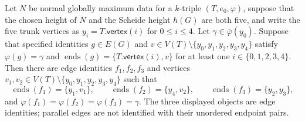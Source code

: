 \begin{lemma}
Let $N$ be normal globally maximum data for a $k$-triple
$(T,e_0,\varphi)$, suppose that the chosen height of $N$ and the Scheide
height $h(G)$ are both five, and write the five trunk vertices as
$y_i=T.\mathsf{vertex}(i)$ for $0\leq i\leq4$.  Let
$\gamma\in\overline\varphi(y_0)$.  Suppose that specified identities
$g\in E(G)$ and $v\in V(T)\setminus\{y_0,y_1,y_2,y_3,y_4\}$ satisfy
$\varphi(g)=\gamma$ and
$\operatorname{ends}(g)=\{T.\mathsf{vertex}(i),v\}$ for at least one
$i\in\{0,1,2,3,4\}$.  Then there are edge identities $f_1,f_2,f_3$ and
vertices $v_1,v_2\in V(T)\setminus\{y_0,y_1,y_2,y_3,y_4\}$ such that
\[
 \operatorname{ends}(f_1)=\{y_1,v_1\},\qquad
 \operatorname{ends}(f_2)=\{y_4,v_2\},\qquad
 \operatorname{ends}(f_3)=\{y_2,y_3\},
\]
and
$\varphi(f_1)=\varphi(f_2)=\varphi(f_3)=\gamma$.
The three displayed objects are edge identities; parallel edges are not
identified with their unordered endpoint pairs.
\end{lemma}
